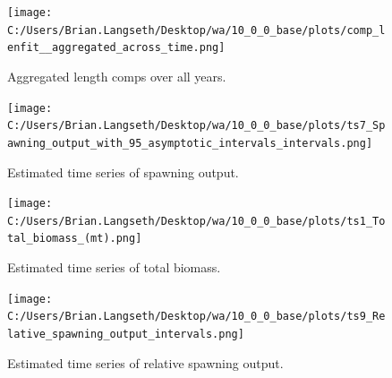 \documentclass[11pt,
  english,
  letterpaper,
]{article}
\begin{document}
\tagmcend\tagstructend


\begin{figure}
\centering
\texttt{[image: C:/Users/Brian.Langseth/Desktop/wa/10\_0\_0\_base/plots/comp\_lenfit\_\_aggregated\_across\_time.png]}
\caption{Aggregated length comps over all years.\label{fig:agg-len-fit}}
\end{figure}

\tagmcend\tagstructend


\begin{figure}
\centering
\texttt{[image: C:/Users/Brian.Langseth/Desktop/wa/10\_0\_0\_base/plots/ts7\_Spawning\_output\_with\_95\_asymptotic\_intervals\_intervals.png]}
\caption{Estimated time series of spawning output.\label{fig:ssb}}
\end{figure}

\tagmcend\tagstructend


\begin{figure}
\centering
\texttt{[image: C:/Users/Brian.Langseth/Desktop/wa/10\_0\_0\_base/plots/ts1\_Total\_biomass\_(mt).png]}
\caption{Estimated time series of total biomass.\label{fig:tot-bio}}
\end{figure}

\tagmcend\tagstructend


\begin{figure}
\centering
\texttt{[image: C:/Users/Brian.Langseth/Desktop/wa/10\_0\_0\_base/plots/ts9\_Relative\_spawning\_output\_intervals.png]}
\caption{Estimated time series of relative spawning output.\label{fig:depl}}
\end{figure}

\tagmcend\tagstructend

\end{document}
